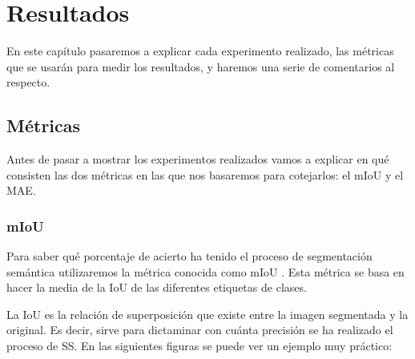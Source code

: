 \chapter{Resultados}

En este capítulo pasaremos a explicar cada experimento realizado, las métricas que se usarán para medir los resultados, y haremos una serie de comentarios al respecto.

\section{Métricas}

Antes de pasar a mostrar los experimentos realizados vamos a explicar en qué consisten las dos métricas en las que nos basaremos para cotejarlos: el \ac{mIoU} y el \ac{MAE}.

\subsection{mIoU}

Para saber qué porcentaje de acierto ha tenido el proceso de segmentación semántica utilizaremos la métrica conocida como \ac{mIoU} \cite{miou-iou}. Esta métrica se basa en hacer la media de la \ac{IoU} de las diferentes etiquetas de clases.

La \ac{IoU} \cite{miou-iou} es la relación de superposición que existe entre la imagen segmentada y la original. Es decir, sirve para dictaminar con cuánta precisión se ha realizado el proceso de \ac{SS}. En las siguientes figuras se puede ver un ejemplo muy práctico:

